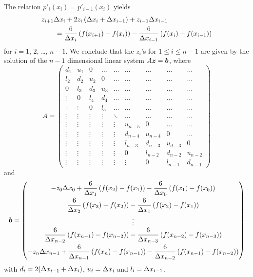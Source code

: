 The relation $p'_i(x_i) = p'_{i-1}(x_i)$ yields
\begin{equation} \label{ncs5}
\begin{split}
&z_{i+1} \Delta{x_i}  +2 z_i \left( \Delta{x_i} + \Delta{x_{i-1}}\right)
+ z_{i-1} \Delta{x_{i-1}} \\
&\qquad = \frac{6}{\Delta{x_i}}\left(f(x_{i+1}) -f(x_i) \right)
- \frac{6}{\Delta{x_{i-1}}} \left(f(x_i) - f(x_{i-1}) \right)
\end{split}
\end{equation}
for $i=1$, $2$, \ldots, $n-1$.  We conclude that the $z_i$'s for
$1\leq i \leq n-1$ are given by the solution of the
$n-1$ dimensional linear system $A \bm{z} = \bm{b}$,
where
\begin{equation} \label{ncs6}
A = \left( \begin{array}{ccccccccc}
d_1  & u_1 & 0 & \ldots & \ldots & \ldots & \ldots & \ldots & \ldots \\ 
l_2 & d_2  & u_2 & 0 & \ldots & \ldots & \ldots & \ldots & \ldots \\ 
0 & l_3 & d_3 & u_3 & \ldots & \ldots & \ldots & \ldots & \ldots \\ 
\vdots & 0 & l_4 & d_4 & \ldots & \ldots & \ldots & \ldots & \ldots \\ 
\vdots & \vdots & 0 & l_5 & \ldots & \ldots & \ldots & \ldots & \ldots \\ 
\vdots & \vdots & \vdots & \vdots & \ddots & \ldots & \ldots &
\ldots & \ldots \\
\vdots & \vdots & \vdots & \vdots & \vdots & u_{n-5} & 0 & \ldots & \ldots \\ 
\vdots & \vdots & \vdots & \vdots & \vdots & d_{n-4} &  u_{n-4} & 0 & \ldots \\ 
\vdots & \vdots & \vdots & \vdots & \vdots & l_{n-3} &  d_{n-3} & u_{d-3} & 0 \\ 
\vdots & \vdots & \vdots & \vdots & \vdots & 0 & l_{n-2} & d_{n-2} & u_{n-2} \\
\vdots & \vdots & \vdots & \vdots & \vdots & \vdots & 0 & l_{n-1} & d_{n-1} 
\end{array} \right)
\end{equation}
and
\[
\bm{b} = \begin{pmatrix}
\displaystyle - z_0 \Delta{x_0} + \frac{6}{\Delta{x_1}}\left(f(x_2)
  -f(x_1) \right) - \frac{6}{\Delta{x_0}} \left(f(x_1) - f(x_0) \right) \\[0.8em]
\displaystyle \frac{6}{\Delta{x_2}}\left(f(x_3) -f(x_2) \right)
- \frac{6}{\Delta{x_1}} \left(f(x_2) - f(x_1) \right) \\[0.8em]
\vdots \\
\displaystyle \frac{6}{\Delta{x_{n-2}}}\left(f(x_{n-1}) -f(x_{n-2}) \right)
- \frac{6}{\Delta{x_{n-3}}} \left(f(x_{n-2}) - f(x_{n-3}) \right) \\[0.8em]
\displaystyle - z_n \Delta{x_{n-1}}
+ \frac{6}{\Delta{x_{n-1}}}\left(f(x_n) -f(x_{n-1}) \right)
- \frac{6}{\Delta{x_{n-2}}}\left(f(x_{n-1}) - f(x_{n-2}) \right)
\end{pmatrix}
\]
with $d_i = 2(\Delta{x_{i-1}} + \Delta{x_i})$, $u_i = \Delta{x_i}$ and
$l_i = \Delta{x_{i-1}}$.

